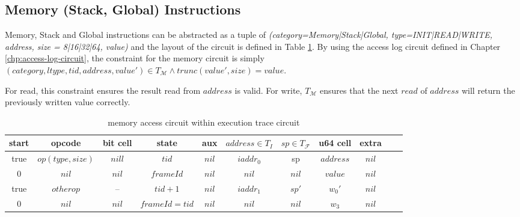 \subsection{Memory (Stack, Global) Instructions}
Memory, Stack and Global instructions can be abstracted as a tuple of \emph{(category=Memory|Stack|Global, type=INIT|READ|WRITE, address, size = 8|16|32|64, value)} and the layout of the circuit is defined in Table \ref{tbl:memory-instruction}. By using the access log circuit defined in Chapter \ref{chp:access-log-circuit}, the constraint for the memory circuit is simply $(category, ltype, tid, address, value') \in T_\mathcal{M} \wedge trunc(value', size) = value$.

\begin{remark}
For read, this constraint ensures the result read from $address$ is valid. For write, $T_\mathcal{M}$ ensures that the next $read$ of $address$ will return the previously written value correctly.
\end{remark}
\begin{table}[!h]
\begin{center}
\begin{tabular}{ | c | c | c | c | c | c | c | c | c | c | c | }
  \hline
  start & opcode & bit cell & state & aux & $address \in T_{I}$ & $sp \in T_\mathcal{F}$& u64 cell & extra \\ 
  \hline
   true & $op(type, size)$ & $nill$ & $tid$ & $nil$ & $iaddr_0$ & sp & $address$ & $nil$\\ 
 \hline
   0 & $nil$ & $nil$ & $frameId$ & $nil$ & $nil$ & $nil$ & $value$ & $nil$\\ 
 \hline
   true & $otherop$ & -- & $tid + 1$ & $nil$ & $iaddr_1$ & $sp'$ & $w_0'$ & $nil$\\
 \hline
   0 & $nil$ & $nil$ & $frameId = tid$ & $nil$ & $nil$ & $nil$ & $w_3$ & $nil$\\ 
 \hline
\end{tabular}
\caption{memory access circuit within execution trace circuit}
\label{tbl:memory-instruction}
\end{center}
\end{table}